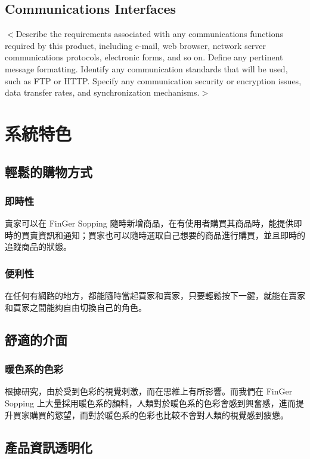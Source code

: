 \documentclass{scrreprt}
\begin{document}
\begin{CJK}{UTF8}{bkai}
\section{Communications Interfaces}
$<$Describe the requirements associated with any communications functions 
required by this product, including e-mail, web browser, network server 
communications protocols, electronic forms, and so on. Define any pertinent 
message formatting. Identify any communication standards that will be used, such 
as FTP or HTTP. Specify any communication security or encryption issues, data 
transfer rates, and synchronization mechanisms.$>$


\chapter{系統特色}
\section{輕鬆的購物方式}

\subsection{即時性}
\qquad 賣家可以在 FinGer Sopping 隨時新增商品，在有使用者購買其商品時，能提供即時的買賣資訊和通知；買家也可以隨時選取自己想要的商品進行購買，並且即時的追蹤商品的狀態。

\subsection{便利性}
\qquad 在任何有網路的地方，都能隨時當起買家和賣家，只要輕鬆按下一鍵，就能在賣家和買家之間能夠自由切換自己的角色。


\section{舒適的介面}

\subsection{暖色系的色彩}
\qquad 根據研究，由於受到色彩的視覺刺激，而在思維上有所影響。而我們在 FinGer Sopping 上大量採用暖色系的顏料，人類對於暖色系的色彩會感到興奮感，進而提升買家購買的慾望，而對於暖色系的色彩也比較不會對人類的視覺感到疲憊。

\section{產品資訊透明化}

\end{CJK}
\end{document}
